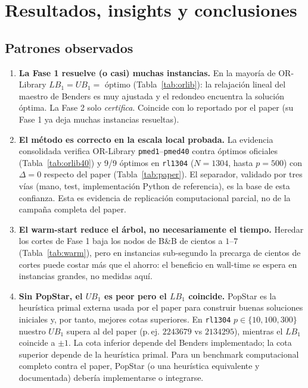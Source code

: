 \section{Resultados, insights y conclusiones}
\label{sec:resultados}

\subsection{Patrones observados}
\begin{enumerate}[leftmargin=1.5em]
  \item \textbf{La Fase 1 resuelve (o casi) muchas instancias.} En la mayoría de OR-Library
        $LB_1=UB_1=$ óptimo (Tabla~\ref{tab:orlib}): la relajación lineal del maestro de Benders es
        muy ajustada y el redondeo encuentra la solución óptima. La Fase 2 solo \emph{certifica}.
        Coincide con lo reportado por el paper (su Fase 1 ya deja muchas instancias resueltas).
  \item \textbf{El método es correcto en la escala local probada.} La evidencia consolidada
        verifica OR-Library \texttt{pmed1}--\texttt{pmed40} contra óptimos oficiales
        (Tabla~\ref{tab:orlib40}) y 9/9 óptimos en \texttt{rl1304} ($N=1304$, hasta $p=500$) con
        $\Delta=0$ respecto del paper (Tabla~\ref{tab:paper}). El separador, validado por tres
        vías (mano, test, implementación Python de referencia), es la base de esta confianza. Esta es evidencia de replicación
        computacional parcial, no de la campaña completa del paper.
  \item \textbf{El warm-start reduce el árbol, no necesariamente el tiempo.} Heredar los cortes de
        Fase 1 baja los nodos de B\&B de cientos a $1$--$7$ (Tabla~\ref{tab:warm}), pero en
        instancias sub-segundo la precarga de cientos de cortes puede costar más que el ahorro: el
        beneficio en wall-time se espera en instancias grandes, no medidas aquí.
  \item \textbf{Sin PopStar, el $UB_1$ es peor pero el $LB_1$ coincide.} PopStar es la
        heurística primal externa usada por el paper para construir buenas soluciones iniciales y,
        por tanto, mejores cotas superiores. En \texttt{rl1304} $p\in\{10,100,300\}$ nuestro
        $UB_1$ supera al del paper (p.\,ej. $2243679$ vs $2134295$), mientras el $LB_1$ coincide a
        $\pm1$. La cota inferior depende del Benders implementado; la cota superior depende de la
        heurística primal. Para un benchmark computacional completo contra el paper, PopStar (o
        una heurística equivalente y documentada) debería implementarse o integrarse.
\end{enumerate}

